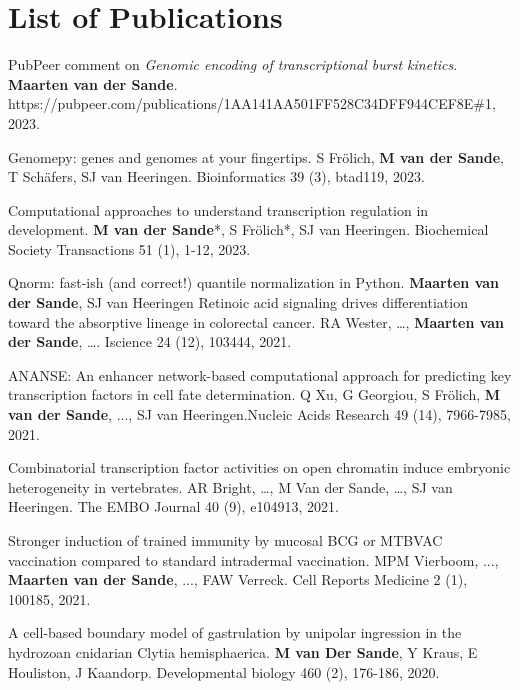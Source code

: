 \section{List of Publications}

PubPeer comment on \textit{Genomic encoding of transcriptional burst kinetics}. \textbf{Maarten van der Sande}. https://pubpeer.com/publications/1AA141AA501FF528C34DFF944CEF8E\#1, 2023.

Genomepy: genes and genomes at your fingertips. S Frölich, \textbf{M van der Sande}, T Schäfers, SJ van Heeringen. Bioinformatics 39 (3), btad119, 2023.

Computational approaches to understand transcription regulation in development. \textbf{M van der Sande}*, S Frölich*, SJ van Heeringen. Biochemical Society Transactions 51 (1), 1-12, 2023.

Qnorm: fast-ish (and correct!) quantile normalization in Python. \textbf{Maarten van der Sande}, SJ van Heeringen
Retinoic acid signaling drives differentiation toward the absorptive lineage in colorectal cancer. RA Wester, \ldots, \textbf{Maarten van der Sande}, \ldots. Iscience 24 (12), 103444, 2021.

ANANSE: An enhancer network-based computational approach for predicting key transcription factors in cell fate determination. Q Xu, G Georgiou, S Frölich, \textbf{M van der Sande}, ..., SJ van Heeringen.Nucleic Acids Research 49 (14), 7966-7985, 2021.

Combinatorial transcription factor activities on open chromatin induce embryonic heterogeneity in vertebrates. AR Bright, \ldots, M Van der Sande, \ldots, SJ van Heeringen. The EMBO Journal 40 (9), e104913, 2021.

Stronger induction of trained immunity by mucosal BCG or MTBVAC vaccination compared to standard intradermal vaccination. MPM Vierboom, ..., \textbf{Maarten van der Sande}, ..., FAW Verreck. Cell Reports Medicine 2 (1), 100185, 2021.

A cell-based boundary model of gastrulation by unipolar ingression in the hydrozoan cnidarian Clytia hemisphaerica. \textbf{M van Der Sande}, Y Kraus, E Houliston, J Kaandorp. Developmental biology 460 (2), 176-186, 2020.
